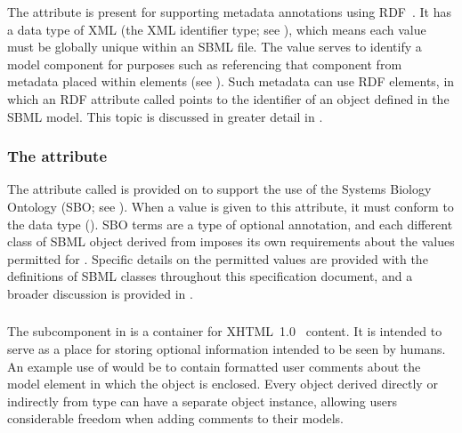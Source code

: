 The  attribute is present for supporting metadata
annotations using RDF~\citep[Resource Description
Format;][]{lassila:1999}.  It has a data type of XML 
(the XML identifier type; see ), which means
each  value must be globally unique within an SBML
file.  The  value serves to identify a model
component for purposes such as referencing that component from
metadata placed within  elements (see
).  Such metadata can use RDF
 elements, in which an RDF attribute called
 points to the  identifier of an
object defined in the SBML model.  This topic is discussed in
greater detail in .


\subsubsection{The  attribute}
\label{sec:sbase-sboterm}

The attribute called  is provided on \SBase to
support the use of the Systems Biology Ontology (SBO; see
).  When a value is given to this attribute,
it must conform to the data type 
().  SBO terms are a type of
optional annotation, and each different class of SBML object
derived from \SBase imposes its own requirements about the values
permitted for .  Specific details on the permitted
values are provided with the definitions of SBML classes
throughout this specification document, and a broader discussion
is provided in .


\subsubsection{}
\label{sec:notes}

The subcomponent \Notes in \SBase is a container for
XHTML~1.0~\citep{pemberton:2002} content.  It is intended to serve
as a place for storing optional information intended to be seen by
humans.  An example use of \Notes would be to contain formatted
user comments about the model element in which the \Notes object
is enclosed.  Every object derived directly or indirectly from
type \SBase can have a separate \Notes object instance, allowing
users considerable freedom when adding comments to their models.

